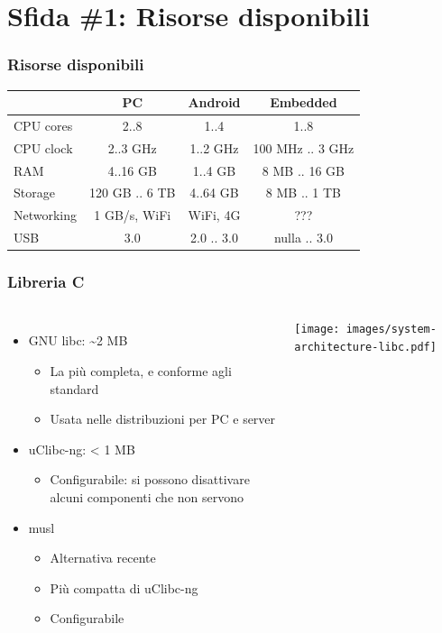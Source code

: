 \documentclass[xetex,table]{beamer}
\begin{document}
\section{Sfida \#1: Risorse disponibili}

\begin{frame}
\frametitle{Risorse disponibili}
{
  \begin{tabular}{ |l|c|c|c|  }
    \hline
     & PC & Android & Embedded \\
    \hline
    CPU cores    & 2..8           & 1..4       & 1..8             \\
    CPU clock    & 2..3 GHz       & 1..2 GHz   & 100 MHz .. 3 GHz \\
    RAM          & 4..16 GB       & 1..4 GB    & 8 MB .. 16 GB    \\
    Storage      & 120 GB .. 6 TB & 4..64 GB   & 8 MB .. 1 TB     \\
    Networking   & 1 GB/s, WiFi   & WiFi, 4G   & ???              \\
    USB          & 3.0            & 2.0 .. 3.0 & nulla .. 3.0     \\
    \hline
  \end{tabular}
}
\end{frame}

\begin{frame}
\frametitle{Libreria C}
  \begin{columns}
    \begin{itemize}
      \item GNU libc: \textasciitilde 2 MB
      \begin{itemize}
        \item La più completa, e conforme agli standard
        \item Usata nelle distribuzioni per PC e server
      \end{itemize}
      \item uClibc-ng: < 1 MB
      \begin{itemize}
        \item Configurabile: si possono disattivare alcuni componenti
          che non servono
      \end{itemize}
      \item musl
      \begin{itemize}
        \item Alternativa recente
        \item Più compatta di uClibc-ng
        \item Configurabile
      \end{itemize}
    \end{itemize}
    \texttt{[image: images/system-architecture-libc.pdf]}
  \end{columns}
\end{frame}
\end{document}
